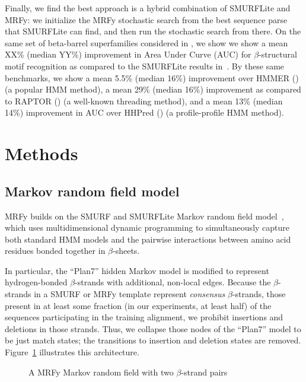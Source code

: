 \documentclass{acm_proc_article-sp}
\begin{document}
Finally, we find the best approach is a hybrid combination of
SMURFLite and MRFy: we initialize the MRFy stochastic search from the
best sequence parse that SMURFLite can find, and then run the
stochastic search from there. On the same set of beta-barrel superfamilies 
considered in \cite{Daniels:2012dg}, we show 
we  show a mean XX\% (median YY\%) improvement in Area Under 
Curve (AUC) for
$\beta$-structural motif recognition as compared to the SMURFLite results 
in~\cite{Daniels:2012dg}.
By these same benchmarks, we show a mean 5.5\% (median 16\%) improvement over
HMMER (\cite{Eddy:1998ut}) (a popular HMM method), a mean 29\% (median
16\%) improvement as compared to RAPTOR (\cite{Xu:2003p3417}) (a
well-known threading method), and a mean 13\% (median 14\%) improvement in AUC 
over HHPred (\cite{Soding:2005ff}) (a profile-profile HMM method).



\section{Methods}

\subsection{Markov random field model}

MRFy builds on the SMURF and SMURFLite Markov random field 
model~\cite{Daniels:2012dg}, which uses multidimensional 
dynamic programming to simultaneously capture both standard HMM models and the
pairwise interactions between amino acid residues bonded together in
$\beta$-sheets. 

In particular, the ``Plan7'' hidden Markov model is modified to represent
hydrogen-bonded $\beta$-strands with additional, non-local edges.
Because the $\beta$-strands in a SMURF or MRFy template represent 
\emph{consensus} 
$\beta$-strands, those present in at least some fraction (in our experiments, 
at least
half) of the sequences participating in the training alignment, we prohibit
insertions and deletions in those strands.
Thus, we collapse those nodes of the ``Plan7'' model to be just match states;
the transitions to insertion and deletion states are removed.
Figure~\ref{mrfy_model} illustrates this architecture.


\begin{figure}[htb!]
\begin{center}
   \caption{A MRFy Markov random field with two $\beta$-strand pairs}
   \label{mrfy_model}
 \end{center}
\end{figure}
\end{document}
